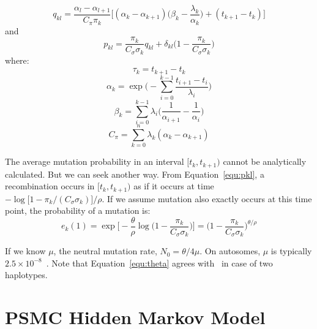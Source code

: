 \documentclass[pdftex,10pt]{article}
\begin{document}
\begin{cor}
\begin{equation*}
    q_{kl}=\frac{\alpha_l-\alpha_{l+1}}{C_{\pi}\pi_k}
  \Bigg[(\alpha_k-\alpha_{k+1})\Big(\beta_k-\frac{\lambda_k}{\alpha_k}\Big)+(t_{k+1}-t_k)\Bigg]
  \end{equation*}
  and
  \begin{equation}\label{equ:pkl}
    p_{kl}=\frac{\pi_k}{C_{\sigma}\sigma_k}q_{kl} + \delta_{kl}\Big(1-\frac{\pi_k}{C_{\sigma}\sigma_k}\Big)
  \end{equation}
  where:
  \begin{equation*}
    \tau_k = t_{k+1}-t_k
  \end{equation*}
  \begin{equation*}
    \alpha_k=\exp\Bigg(-\sum_{i=0}^{k-1}\frac{t_{i+1}-t_i}{\lambda_i}\Bigg)
  \end{equation*}
  \begin{equation*}
    \beta_k=\sum_{i=0}^{k-1}\lambda_i\Big(\frac{1}{\alpha_{i+1}}-\frac{1}{\alpha_i}\Big)
  \end{equation*}
  \begin{equation*}
    C_{\pi}=\sum_{k=0}^n\lambda_k(\alpha_k-\alpha_{k+1})
  \end{equation*}
\end{cor}

\begin{rem}\label{rem:mutprob}
  The average mutation probability in an interval $[t_k,t_{k+1})$ cannot
  be analytically calculated. But we can seek another way. From
  Equation~\ref{equ:pkl}, a recombination occurs in $[t_k,t_{k+1})$ as if
  it occurs at time
  $-\log\Big[1-\pi_k/(C_{\sigma}\sigma_k)\Big]/\rho$. If we assume
  mutation also exactly occurs at this time point, the probability of a
  mutation is:
  \begin{equation}\label{equ:ek1}
    e_k(1) = \exp\Bigg[-\frac{\theta}{\rho}\log\Big(1-\frac{\pi_k}{C_{\sigma}\sigma_k}\Big)\Bigg]
    = \Big(1-\frac{\pi_k}{C_{\sigma}\sigma_k}\Big)^{\theta/\rho}
  \end{equation}
\end{rem}

\begin{rem}[Determining $N_0$]\label{rem:n0}
  If we know $\mu$, the neutral mutation rate, $N_0=\theta/4\mu$. On
  autosomes, $\mu$ is typically
  $2.5\times10^{-8}$~\citep{Nachman:2000rq}. Note that
  Equation~\ref{equ:theta} agrees with~\citet{Marth:2004vn} in case of
  two haplotypes.
\end{rem}

\section{PSMC Hidden Markov Model}
\end{document}
